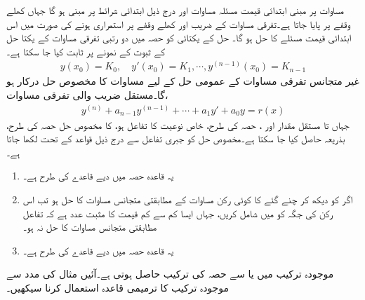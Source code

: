 مساوات  پر مبنی ابتدائی قیمت مسئلہ مساوات  اور درج ذیل  ابتدائی شرائط پر مبنی ہو گا جہاں  کھلے وقفے  پر پایا جاتا ہے۔تفرقی مساوات کے  ضریب  اور  کھلے وقفے پر استمراری ہونے کی صورت میں اس ابتدائی قیمت مسئلے کا حل  ہو گا۔ حل کے یکتائی کو حصہ  میں دو رتبی تفرقی مساوات کے یکتا حل کے ثبوت کے نمونے پر ثابت کیا جا سکتا ہے۔
\begin{align}
y(x_0)=K_0, \quad y'(x_0)=K_1, \cdots , y^{(n-1)}(x_0)=K_{n-1}
\end{align}
غیر متجانس تفرقی مساوات  کے عمومی حل کے لیے مساوات  کا مخصوص حل درکار ہو گا۔مستقل  ضریب  والی تفرقی مساوات،
\begin{align}\label{مساوات_سادہ_بلند_مستقل_عددی_سر_غیر_متجانس_الف}
y^{(n)}+a_{n-1}y^{(n-1)}+\cdots+a_1y'+a_0 y=r(x)
\end{align}
جہاں  تا  مستقل مقدار اور ، حصہ  کی طرح، خاص نوعیت کا تفاعل ہو، کا مخصوص حل  حصہ  کی طرح، بذریعہ  حاصل کیا جا سکتا ہے۔مخصوص حل  کو جبری تفاعل  سے درج ذیل قواعد کے تحت لکھا جاتا ہے۔
\begin{enumerate}
\item[بنیادی قاعدہ:]\label{قاعدہ_سادہ_بلند_بنیادی_قاعدہ}
یہ قاعدہ حصہ  میں دیے قاعدے  کی طرح ہے۔
\item[ترمیمی قاعدہ:]\label{قاعدہ_سادہ_بلند_ترمیمی_قاعدہ}
اگر  کو دیکھ کر چنے گئے   کا کوئی رکن   مساوات  کے  مطابقتی متجانس مساوات کا حل  ہو تب  اس رکن کی جگہ  کو   میں شامل کریں، جہاں  ایسا کم سے کم قیمت کا مثبت عدد ہے کہ تفاعل  مطابقتی متجانس مساوات کا حل نہ ہو۔
\item[مجموعے کا قاعدہ:]\label{قاعدہ_سادہ_بلند_مجموعہ_قاعدہ}
یہ قاعدہ حصہ  میں دیے قاعدے کی طرح ہے۔
\end{enumerate} 

موجودہ ترکیب میں  یا  سے حصہ  کی ترکیب حاصل ہوتی ہے۔آئیں مثال کی مدد سے موجودہ ترکیب کا ترمیمی قاعدہ  استعمال کرنا سیکھیں۔

